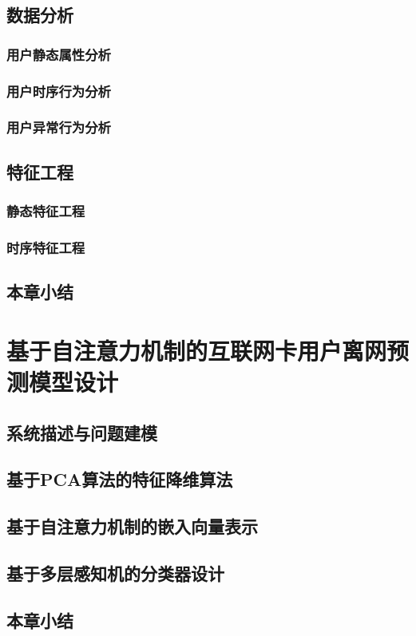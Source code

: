 \subsection{数据分析}
\subsubsection{用户静态属性分析}
\subsubsection{用户时序行为分析}
\subsubsection{用户异常行为分析}
\subsection{特征工程}
\subsubsection{静态特征工程}
\subsubsection{时序特征工程}
\subsection{本章小结}

\section{基于自注意力机制的互联网卡用户离网预测模型设计}
\subsection{系统描述与问题建模}
\subsection{基于PCA算法的特征降维算法}
\subsection{基于自注意力机制的嵌入向量表示}
\subsection{基于多层感知机的分类器设计}
\subsection{本章小结}

